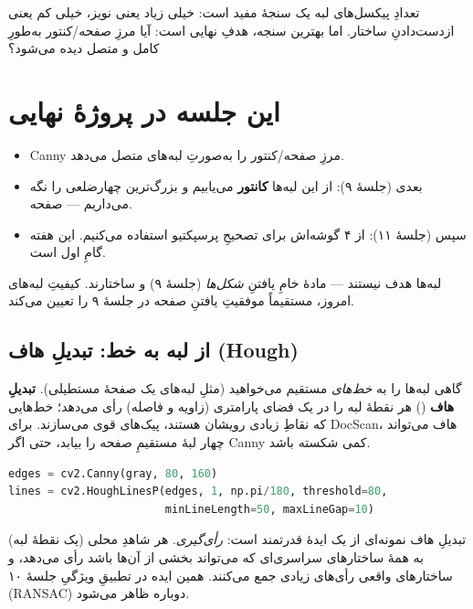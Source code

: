 \documentclass[12pt,a4paper]{article}
\begin{document}
\begin{nokte}
تعدادِ پیکسل‌های لبه یک سنجهٔ مفید است: خیلی زیاد یعنی نویز، خیلی کم یعنی از‌دست‌دادنِ ساختار.
اما بهترین سنجه، هدفِ نهایی است: آیا مرزِ صفحه/کنتور به‌طورِ کامل و متصل دیده می‌شود؟
\end{nokte}

\section{این جلسه در پروژهٔ نهایی}

\begin{itemize}
  \item Canny مرزِ صفحه/کنتور را به‌صورتِ لبه‌های متصل می‌دهد.
  \item بعدی (جلسهٔ ۹): از این لبه‌ها \textbf{کانتور} می‌یابیم و بزرگ‌ترین چهارضلعی را نگه می‌داریم — صفحه.
  \item سپس (جلسهٔ ۱۱): از ۴ گوشه‌اش برای تصحیحِ پرسپکتیو استفاده می‌کنیم. این هفته گامِ اول است.
\end{itemize}

\begin{nokte}
لبه‌ها هدف نیستند — مادهٔ خامِ یافتنِ \emph{شکل‌ها} (جلسهٔ ۹) و ساختارند. کیفیتِ لبه‌های امروز،
مستقیماً موفقیتِ یافتنِ صفحه در جلسهٔ ۹ را تعیین می‌کند.
\end{nokte}

\subsection{از لبه به خط: تبدیلِ هاف (Hough)}

گاهی لبه‌ها را به \emph{خط‌های} مستقیم می‌خواهید (مثلِ لبه‌های یک صفحهٔ مستطیلی). \textbf{تبدیلِ
هاف} () هر نقطهٔ لبه را در یک فضای پارامتری (زاویه و فاصله) رأی می‌دهد؛
خط‌هایی که نقاطِ زیادی رویشان هستند، پیک‌های قوی می‌سازند. برای DocScan، هاف می‌تواند چهار لبهٔ
مستقیمِ صفحه را بیابد، حتی اگر Canny کمی شکسته باشد.

\begin{ltrcode}
\begin{lstlisting}[language=Python]
edges = cv2.Canny(gray, 80, 160)
lines = cv2.HoughLinesP(edges, 1, np.pi/180, threshold=80,
                        minLineLength=50, maxLineGap=10)
\end{lstlisting}
\end{ltrcode}

\begin{yaddasht}
تبدیلِ هاف نمونه‌ای از یک ایدهٔ قدرتمند است: \emph{رأی‌گیری}. هر شاهدِ محلی (یک نقطهٔ لبه) به همهٔ
ساختارهای سراسری‌ای که می‌تواند بخشی از آن‌ها باشد رأی می‌دهد، و ساختارهای واقعی رأی‌های زیادی
جمع می‌کنند. همین ایده در تطبیقِ ویژگیِ جلسهٔ ۱۰ (RANSAC) دوباره ظاهر می‌شود.
\end{yaddasht}
\end{document}
